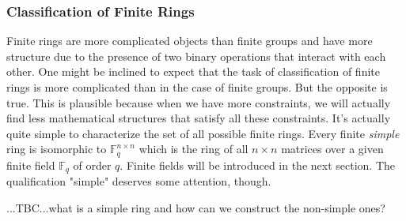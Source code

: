 
\subsubsection{Classification of Finite Rings}
Finite rings are more complicated objects than finite groups and have more structure due to the presence of two binary operations that interact with each other. One might be inclined to expect that the task of classification of finite rings is more complicated than in the case of finite groups. But the opposite is true. This is plausible because when we have more constraints, we will actually find less mathematical structures that satisfy all these constraints. It's actually quite simple to characterize the set of all possible finite rings. Every finite \emph{simple} ring is isomorphic to $\mathbb{F}_q^{n \times n}$ which is the ring of all $n \times n$ matrices over a given finite field $\mathbb{F}_q$ of order $q$. Finite fields will be introduced in the next section. The qualification "simple" deserves some attention, though.

...TBC...what is a simple ring and how can we construct the non-simple ones?



